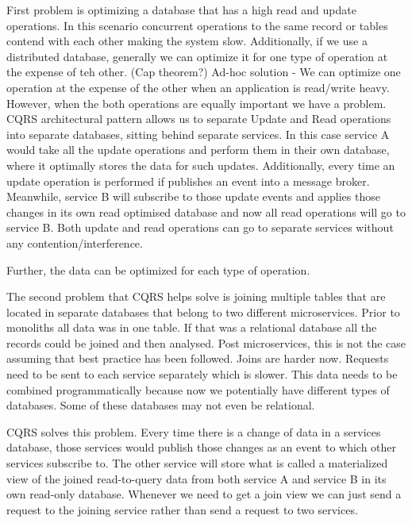\documentclass[a4paper, 11pt]{book}
\begin{document}
    First problem is optimizing a database that has a high read and update operations.
    In this scenario concurrent operations to the same record or tables contend with each other making the system slow.
    Additionally, if we use a distributed database, generally we can optimize it for one type of operation at the expense of teh other.
    (Cap theorem?)
    Ad-hoc solution - We can optimize one operation at the expense of the other when an application is read/write heavy.
    However, when the both operations are equally important we have a problem.
    CQRS architectural pattern allows us to separate Update and Read operations into separate databases, sitting behind separate services.
    In this case service A would take all the update operations and perform them in their own database, where it optimally stores the data for such updates.
    Additionally, every time an update operation is performed if publishes an event into a message broker.
    Meanwhile, service B will subscribe to those update events and applies those changes in its own read optimised database and now all read operations will go to service B.
    Both update and read operations can go to separate services without any contention/interference.

    Further, the data can be optimized for each type of operation.

    The second problem that CQRS helps solve is joining multiple tables that are located in separate databases that belong to two different microservices.
    Prior to monoliths all data was in one table.
    If that was a relational database all the records could be joined and then analysed.
    Post microservices, this is not the case assuming that best practice has been followed.
    Joins are harder now.
    Requests need to be sent to each service separately which is slower.
    This data needs to be combined programmatically because now we potentially have different types of databases.
    Some of these databases may not even be relational.

    CQRS solves this problem.
    Every time there is a change of data in a services database, those services would publish those changes as an event to which other services subscribe to.
    The other service will store what is called a materialized view of the joined read-to-query data from both service A and service B in its own read-only database.
    Whenever we need to get a join view we can just send a request to the joining service rather than send a request to two services.
\end{document}
